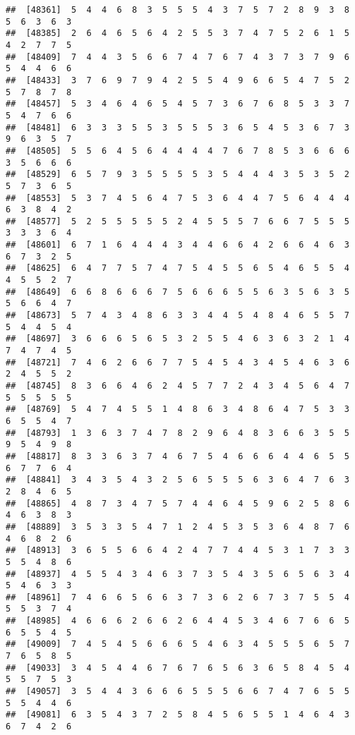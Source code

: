 \documentclass[
]{book}
\begin{document}
\begin{verbatim}
##  [48361]  5  4  4  6  8  3  5  5  5  4  3  7  5  7  2  8  9  3  8  5  6  3  6  3
##  [48385]  2  6  4  6  5  6  4  2  5  5  3  7  4  7  5  2  6  1  5  4  2  7  7  5
##  [48409]  7  4  4  3  5  6  6  7  4  7  6  7  4  3  7  3  7  9  6  5  4  4  6  6
##  [48433]  3  7  6  9  7  9  4  2  5  5  4  9  6  6  5  4  7  5  2  5  7  8  7  8
##  [48457]  5  3  4  6  4  6  5  4  5  7  3  6  7  6  8  5  3  3  7  5  4  7  6  6
##  [48481]  6  3  3  3  5  5  3  5  5  5  3  6  5  4  5  3  6  7  3  9  6  3  5  7
##  [48505]  5  5  6  4  5  6  4  4  4  4  7  6  7  8  5  3  6  6  6  3  5  6  6  6
##  [48529]  6  5  7  9  3  5  5  5  5  3  5  4  4  4  3  5  3  5  2  5  7  3  6  5
##  [48553]  5  3  7  4  5  6  4  7  5  3  6  4  4  7  5  6  4  4  4  6  3  8  4  2
##  [48577]  5  2  5  5  5  5  5  2  4  5  5  5  7  6  6  7  5  5  5  3  3  3  6  4
##  [48601]  6  7  1  6  4  4  4  3  4  4  6  6  4  2  6  6  4  6  3  6  7  3  2  5
##  [48625]  6  4  7  7  5  7  4  7  5  4  5  5  6  5  4  6  5  5  4  4  5  5  2  7
##  [48649]  6  6  8  6  6  6  7  5  6  6  6  5  5  6  3  5  6  3  5  5  6  6  4  7
##  [48673]  5  7  4  3  4  8  6  3  3  4  4  5  4  8  4  6  5  5  7  5  4  4  5  4
##  [48697]  3  6  6  6  5  6  5  3  2  5  5  4  6  3  6  3  2  1  4  7  4  7  4  5
##  [48721]  7  4  6  2  6  6  7  7  5  4  5  4  3  4  5  4  6  3  6  2  4  5  5  2
##  [48745]  8  3  6  6  4  6  2  4  5  7  7  2  4  3  4  5  6  4  7  5  5  5  5  5
##  [48769]  5  4  7  4  5  5  1  4  8  6  3  4  8  6  4  7  5  3  3  6  5  5  4  7
##  [48793]  1  3  6  3  7  4  7  8  2  9  6  4  8  3  6  6  3  5  5  9  5  4  9  8
##  [48817]  8  3  3  6  3  7  4  6  7  5  4  6  6  6  4  4  6  5  5  6  7  7  6  4
##  [48841]  3  4  3  5  4  3  2  5  6  5  5  5  6  3  6  4  7  6  3  2  8  4  6  5
##  [48865]  4  8  7  3  4  7  5  7  4  4  6  4  5  9  6  2  5  8  6  4  6  3  8  3
##  [48889]  3  5  3  3  5  4  7  1  2  4  5  3  5  3  6  4  8  7  6  4  6  8  2  6
##  [48913]  3  6  5  5  6  6  4  2  4  7  7  4  4  5  3  1  7  3  3  5  5  4  8  6
##  [48937]  4  5  5  4  3  4  6  3  7  3  5  4  3  5  6  5  6  3  4  5  4  6  3  3
##  [48961]  7  4  6  6  5  6  6  3  7  3  6  2  6  7  3  7  5  5  4  5  5  3  7  4
##  [48985]  4  6  6  6  2  6  6  2  6  4  4  5  3  4  6  7  6  6  5  6  5  5  4  5
##  [49009]  7  4  5  4  5  6  6  6  5  4  6  3  4  5  5  5  6  5  7  7  6  5  8  5
##  [49033]  3  4  5  4  4  6  7  6  7  6  5  6  3  6  5  8  4  5  4  5  5  7  5  3
##  [49057]  3  5  4  4  3  6  6  6  5  5  5  6  6  7  4  7  6  5  5  5  5  4  4  6
##  [49081]  6  3  5  4  3  7  2  5  8  4  5  6  5  5  1  4  6  4  3  6  7  4  2  6

\end{verbatim}
\end{document}
